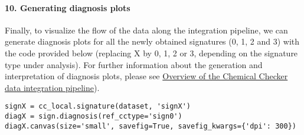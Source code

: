 \paragraph{10. Generating diagnosis plots} \leavevmode

Finally, to visualize the flow of the data along the integration pipeline, we can generate diagnosis plots for all the newly obtained signatures (0, 1, 2 and 3) with the code provided below (replacing X by 0, 1, 2 or 3, depending on the signature type under analysis). For further information about the generation and interpretation of diagnosis plots, please see \hyperref[Overview of the Chemical Checker data integration pipeline]{Overview of the Chemical Checker data integration pipeline}). \\

\begin{lstlisting}
signX = cc_local.signature(dataset, 'signX')
diagX = sign.diagnosis(ref_cctype='sign0')
diagX.canvas(size='small', savefig=True, savefig_kwargs={'dpi': 300})
\end{lstlisting}
